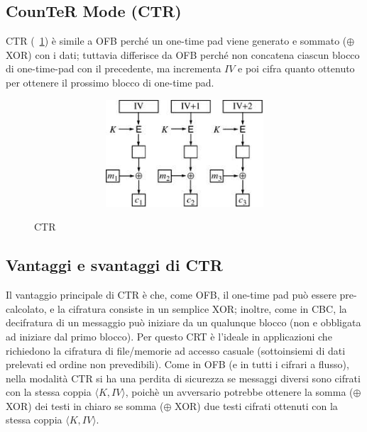 \subsection{CounTeR Mode (CTR)}
CTR (\figurename ~\ref{fig:CTR}) è simile a OFB perché un one-time pad viene generato e sommato ($\oplus$ XOR) con i dati; tuttavia differisce da OFB perché non concatena ciascun blocco di one-time-pad con il precedente, ma incrementa $IV$ e poi cifra quanto ottenuto per ottenere il prossimo blocco di one-time pad. 
\begin{figure}[htbp]
	\centering%
	\subfigure%
	{\includegraphics[height=4cm, width=12cm, keepaspectratio]{Immagini/Capitolo3/CTR.png}}
	\caption{CTR \label{fig:CTR}} 	
\end{figure}
\subsection{Vantaggi e svantaggi di CTR}
Il vantaggio principale di CTR è che, come OFB, il one-time pad può essere pre-calcolato, e la cifratura consiste in un semplice XOR; inoltre, come in CBC, la decifratura di un messaggio può iniziare da un qualunque blocco (non e obbligata ad iniziare dal primo blocco). Per questo CRT è l'ideale in applicazioni che richiedono la cifratura di file/memorie ad accesso casuale (sottoinsiemi di dati prelevati ed ordine non prevedibili).\newline \newline
Come in OFB (e in tutti i cifrari a flusso), nella modalità CTR si ha una perdita di sicurezza se messaggi diversi sono cifrati con la stessa coppia $\langle K, IV \rangle$, poichè un avversario potrebbe ottenere la somma ($\oplus$ XOR) dei testi in chiaro se somma ($\oplus$ XOR) due testi cifrati ottenuti con la stessa coppia $\langle K, IV \rangle$.

